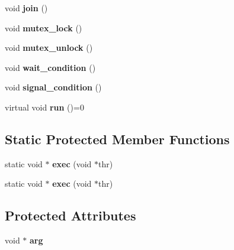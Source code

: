 \begin{DoxyCompactItemize}
\item 
\hypertarget{class_thread_a4d9d788e98388a3217831a9046709deb}{void {\bfseries join} ()}\label{class_thread_a4d9d788e98388a3217831a9046709deb}

\item 
\hypertarget{class_thread_abebed72ba5d26e986574371a5371b024}{void {\bfseries mutex\-\_\-lock} ()}\label{class_thread_abebed72ba5d26e986574371a5371b024}

\item 
\hypertarget{class_thread_a21c6a56830820fdf99d2bb6d99a19081}{void {\bfseries mutex\-\_\-unlock} ()}\label{class_thread_a21c6a56830820fdf99d2bb6d99a19081}

\item 
\hypertarget{class_thread_a91a2e7457bcdaa818928ae53cb983e9d}{void {\bfseries wait\-\_\-condition} ()}\label{class_thread_a91a2e7457bcdaa818928ae53cb983e9d}

\item 
\hypertarget{class_thread_a18c72fa2b30643a324b24dc9a7227650}{void {\bfseries signal\-\_\-condition} ()}\label{class_thread_a18c72fa2b30643a324b24dc9a7227650}

\item 
\hypertarget{class_thread_aae90dfabab3e1776cf01a26e7ee3a620}{virtual void {\bfseries run} ()=0}\label{class_thread_aae90dfabab3e1776cf01a26e7ee3a620}

\end{DoxyCompactItemize}
\subsection*{Static Protected Member Functions}
\begin{DoxyCompactItemize}
\item 
\hypertarget{class_thread_ad8723a3f6acb31ac5e6c7ca459bfd42e}{static void $\ast$ {\bfseries exec} (void $\ast$thr)}\label{class_thread_ad8723a3f6acb31ac5e6c7ca459bfd42e}

\item 
\hypertarget{class_thread_a841d30569b35d4dd31a07877457c6273}{static void $\ast$ {\bfseries exec} (void $\ast$thr)}\label{class_thread_a841d30569b35d4dd31a07877457c6273}

\end{DoxyCompactItemize}
\subsection*{Protected Attributes}
\begin{DoxyCompactItemize}
\item 
\hypertarget{class_thread_a15fe7d7ec9cf8fa99d773c2a12cf6930}{void $\ast$ {\bfseries arg}}\label{class_thread_a15fe7d7ec9cf8fa99d773c2a12cf6930}

\end{DoxyCompactItemize}


